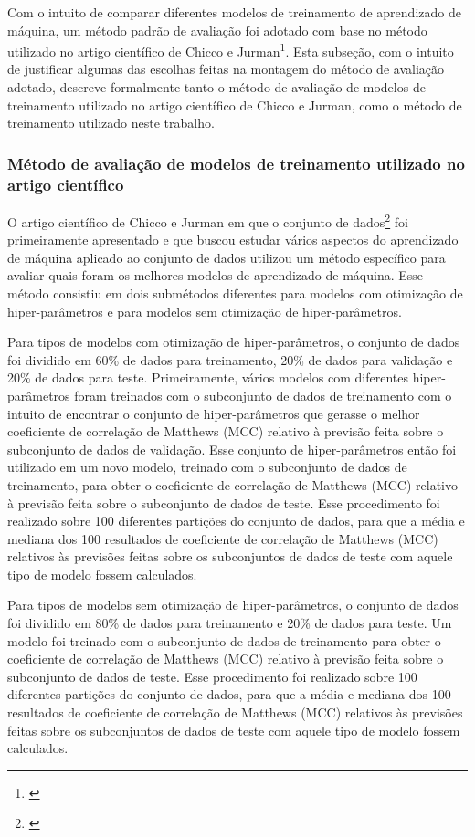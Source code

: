 Com o intuito de comparar diferentes modelos de treinamento de aprendizado de máquina, um método padrão de avaliação foi adotado com base no método utilizado no artigo científico de Chicco e Jurman\footnote{\cite{chicco2020}}. Esta subseção, com o intuito de justificar algumas das escolhas feitas na montagem do método de avaliação adotado, descreve formalmente tanto o método de avaliação de modelos de treinamento utilizado no artigo científico de Chicco e Jurman, como o método de treinamento utilizado neste trabalho.

\subsubsection{Método de avaliação de modelos de treinamento utilizado no artigo científico}

O artigo científico de Chicco e Jurman em que o conjunto de dados\footnote{\cite{larxel_dataset}} foi primeiramente apresentado e que buscou estudar vários aspectos do aprendizado de máquina aplicado ao conjunto de dados utilizou um método específico para avaliar quais foram os melhores modelos de aprendizado de máquina. Esse método consistiu em dois submétodos diferentes para modelos com otimização de hiper-parâmetros e para modelos sem otimização de hiper-parâmetros.

Para tipos de modelos com otimização de hiper-parâmetros, o conjunto de dados foi dividido em 60\% de dados para treinamento, 20\% de dados para validação e 20\% de dados para teste. Primeiramente, vários modelos com diferentes hiper-parâmetros foram treinados com o subconjunto de dados de treinamento com o intuito de encontrar o conjunto de hiper-parâmetros que gerasse o melhor coeficiente de correlação de Matthews (MCC) relativo à previsão feita sobre o subconjunto de dados de validação. Esse conjunto de hiper-parâmetros então foi utilizado em um novo modelo, treinado com o subconjunto de dados de treinamento, para obter o coeficiente de correlação de Matthews (MCC) relativo à previsão feita sobre o subconjunto de dados de teste. Esse procedimento foi realizado sobre 100 diferentes partições do conjunto de dados, para que a média e mediana dos 100 resultados de coeficiente de correlação de Matthews (MCC) relativos às previsões feitas sobre os subconjuntos de dados de teste com aquele tipo de modelo fossem calculados.

Para tipos de modelos sem otimização de hiper-parâmetros, o conjunto de dados foi dividido em 80\% de dados para treinamento e 20\% de dados para teste. Um modelo foi treinado com o subconjunto de dados de treinamento para obter o coeficiente de correlação de Matthews (MCC) relativo à previsão feita sobre o subconjunto de dados de teste. Esse procedimento foi realizado sobre 100 diferentes partições do conjunto de dados, para que a média e mediana dos 100 resultados de coeficiente de correlação de Matthews (MCC) relativos às previsões feitas sobre os subconjuntos de dados de teste com aquele tipo de modelo fossem calculados.

